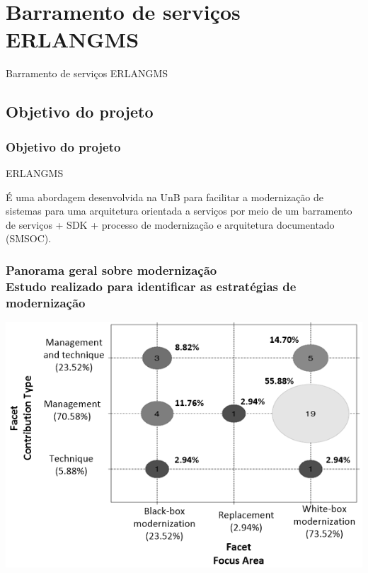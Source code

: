 \documentclass{beamer}
\begin{document}


\section{Barramento de serviços ERLANGMS}


\begin{frame}[c]{ }
\centering
\huge{Barramento de serviços ERLANGMS}
\end{frame}


\subsection{Objetivo do projeto}


\begin{frame}
\frametitle{Objetivo do projeto}

\begin{exampleblock}{ERLANGMS}
	
	É uma abordagem desenvolvida na UnB para facilitar a modernização de sistemas para uma arquitetura orientada a serviços 
	por meio de um barramento de serviços + SDK + processo 
	de modernização e arquitetura documentado (SMSOC).
	
\end{exampleblock}


\end{frame}



\begin{frame}
\frametitle{Panorama geral sobre modernização  \\ \small{Estudo realizado para identificar as estratégias de modernização}}


	\centering
	\includegraphics[scale=0.45]{img/bubble_diagram.png}

\end{frame}
\end{document}
